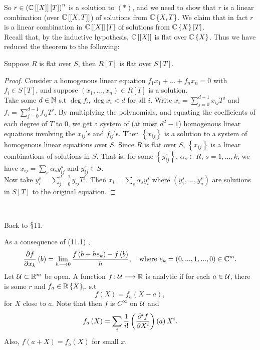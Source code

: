 So $r\in\left(\mathbb{C}\left[\left[X\right]\right]\left[T\right]\right)^{n}$
is a solution to $\left(\ast\right)$, and we need to show that $r$
is a linear combination (over $\mathbb{C}\left[\left[X,T\right]\right]$)
of solutions from $\mathbb{C}\left\{ X,T\right\} $. We claim that in fact
$r$ is a linear combination in $\mathbb{C}\left[\left[X\right]\right]\left[T\right]$
of solutions from $\mathbb{C}\left\{ X\right\} \left[T\right]$. \\
Recall that, by the inductive hypothesis, $\mathbb{C}\left[\left[X\right]\right]$
is flat over $\mathbb{C}\left\{ X\right\} $. Thus we have reduced the theorem
to the following:
\begin{prop*}
Suppose $R$ is flat over $S$, then $R\left[T\right]$ is flat over
$S\left[T\right]$.\end{prop*}
\begin{proof}
Consider a homogenous linear equation $f_{1}x_{1}+...+f_{n}x_{n}=0$
with $f_{i}\in S\left[T\right]$, and suppose $\left(x_{1},...,x_{n}\right)\in R\left[T\right]$
is a solution. \\
Take some $d\in\mathbb{N}$ s.t $\deg f_{i},\deg x_{i}<d$ for all $i$. Write
$x_{i}=\sum_{j=0}^{d-1}x_{ij}T^{j}$ and $f_{i}=\sum_{j=0}^{d-1}f_{ij}T^{j}$.
By multiplying the polynomials, and equating the coefficients of each
degree of $T$ to $0$, we get a system of (at most $d^{2}-1$) homogenous
linear equations involving the $x_{ij}$'s and $f_{ij}$'s. Then $\left\{ x_{ij}\right\} $
is a solution to a system of homogenous linear equations over $S$.
Since $R$ is flat over $S$, $\left\{ x_{ij}\right\} $ is a linear
combinations of solutions in $S$. That is, for some $\left\{ y_{ij}^{s}\right\} $,
$\alpha_{s}\in R$, $s=1,...,k$, we have $x_{ij}=\sum_{s}\alpha_{s}y_{ij}^{s}$
and $y_{ij}^{s}\in S$.\\
Now take $y_{i}^{s}=\sum_{j=0}^{d-1}y_{ij}T^{j}$. Then $x_{i}=\sum_{s}\alpha_{s}y_{i}^{s}$
where $\left(y_{1}^{s},...,y_{n}^{s}\right)$ are solutions in $S\left[T\right]$
to the original equation.
\end{proof}
~

Back to $\mathsection$11.

As a consequence of (11.1) , 
\[
\frac{\partial f}{\partial x_{k}}\left(b\right)=\lim_{h\longrightarrow0}\frac{f\left(b+he_{k}\right)-f\left(b\right)}{h},\quad\textrm{where }e_{k}=\left(0,...,1,...,0\right)\in\mathbb{C}^{m}.
\]
Let $\mathcal{U}\subset\mathbb{R}^{m}$ be open. A function $f\colon\mathcal{U}\longrightarrow\mathbb{R}$ is analytic
if for each $a\in\mathcal{U}$, there is some $r$ and $f_{a}\in\mathbb{R}\left\{ X\right\} _{r}$
s.t 
\[
f\left(X\right)=f_{a}\left(X-a\right),
\]
for $X$ close to $a$. Note that then $f$ is $C^{\infty}$ on $\mathcal{U}$
and 
\[
f_{a}\left(X\right)=\sum_{i}\frac{1}{i!}\left(\frac{\partial^{i}f}{\partial X^{i}}\right)\left(a\right)X^{i}.
\]
Also, $f\left(a+X\right)=f_{a}\left(X\right)$ for small $x$.

